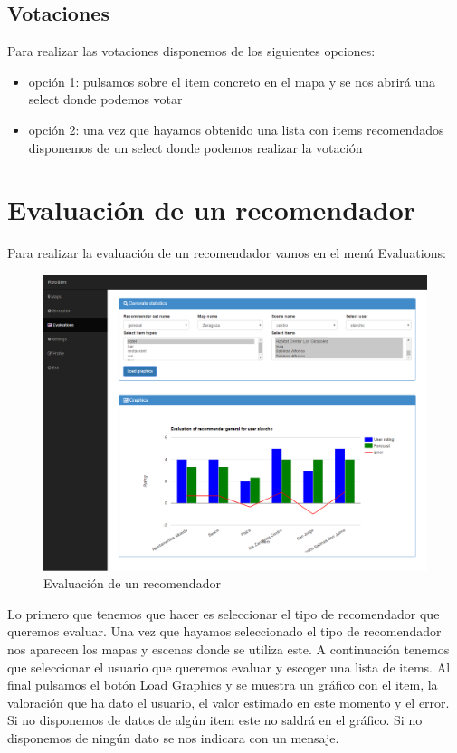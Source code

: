 \subsection{Votaciones}

Para realizar las votaciones disponemos de los siguientes opciones:

\begin{itemize}
	\item opción 1: pulsamos sobre el item concreto en el mapa y se nos abrirá una select donde podemos votar
	\item opción 2: una vez que hayamos obtenido una lista con items recomendados disponemos de un select donde podemos realizar la votación
\end{itemize}

\newpage

\section{Evaluación de un recomendador}

Para realizar la evaluación de un recomendador vamos en el menú Evaluations:

\begin{figure}[H]
	\centering\includegraphics[scale=0.35]{imagenes/capitulo12/evaluacion.png}
	\caption{Evaluación de un recomendador}
	\label{img:evaluacion}
\end{figure}

Lo primero que tenemos que hacer es seleccionar el tipo de recomendador que queremos evaluar. Una vez que hayamos seleccionado el tipo de recomendador nos aparecen los mapas y escenas donde se utiliza este. A continuación tenemos que seleccionar el usuario que queremos evaluar y escoger una lista de items. Al final pulsamos el botón Load Graphics y se muestra un gráfico con el item, la valoración que ha dato el usuario, el valor estimado en este momento y el error. Si no disponemos de datos de algún item este no saldrá en el gráfico. Si no disponemos de ningún dato se nos indicara con un mensaje.
